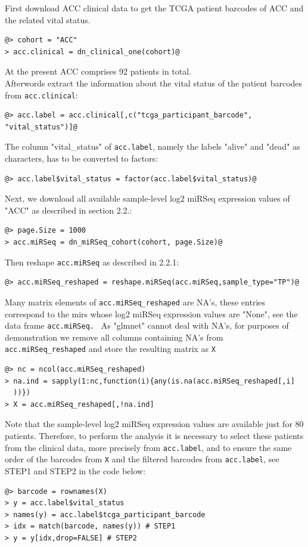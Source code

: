\documentclass{TechReport}
\begin{document}
First download ACC clinical data to get the TCGA patient barcodes of ACC and the
related vital status.
\begin{lstlisting}[style=base]
@> cohort = "ACC"
> acc.clinical = dn_clinical_one(cohort)@
\end{lstlisting}
At the present ACC comprises 92 patients in total.\\ 
Afterwords extract the information about the vital status of the patient barcodes
from {\tt acc.clinical}:
\begin{lstlisting}[style=base]
@> acc.label = acc.clinical[,c("tcga_participant_barcode",
"vital_status")]@
\end{lstlisting}
The column "vital\_status" of {\tt acc.label}, namely the labels "alive" and "dead" as characters, 
has to be converted to factors:
\begin{lstlisting}[style=base]
@> acc.label$vital_status = factor(acc.label$vital_status)@
\end{lstlisting}
Next, we download all available sample-level log2 miRSeq expression values of "ACC"
as described in section 2.2.:
\begin{lstlisting}[style=base]
@> page.Size = 1000
> acc.miRSeq = dn_miRSeq_cohort(cohort, page.Size)@
\end{lstlisting}
Then reshape {\tt acc.miRSeq} as described in 2.2.1:
\begin{lstlisting}[style=base]
@> acc.miRSeq_reshaped = reshape.miRSeq(acc.miRSeq,sample_type="TP")@
\end{lstlisting}
Many matrix elements of {\tt acc.miRSeq\_reshaped} are NA's, these entries correspond
to the mirs whose log2 miRSeq expression values are "None", see the data frame {\tt acc.miRSeq. }
 As "glmnet" cannot deal with NA's, for purposes of demonstration we remove all columns containing NA's
from {\tt acc.miRSeq\_reshaped} and store the resulting matrix as {\tt X}
\begin{lstlisting}[style=base]
@> nc = ncol(acc.miRSeq_reshaped)
> na.ind = sapply(1:nc,function(i){any(is.na(acc.miRSeq_reshaped[,i]
  ))})
> X = acc.miRSeq_reshaped[,!na.ind]
\end{lstlisting}
Note that the sample-level log2 miRSeq expression values are available just for 80 patients.
Therefore, to perform the analysis it is necessary to select these patients from the clinical data, 
more precisely from {\tt acc.label}, and to ensure the same order of the barcodes from {\tt X}
and the filtered barcodes from {\tt acc.label}, see STEP1 and STEP2 in the code below:
\begin{lstlisting}[style=base]
@> barcode = rownames(X) 
> y = acc.label$vital_status
> names(y) = acc.label$tcga_participant_barcode
> idx = match(barcode, names(y)) # STEP1
> y = y[idx,drop=FALSE] # STEP2
\end{lstlisting}
\end{document}
